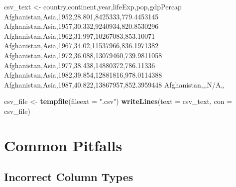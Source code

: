 \documentclass[
]{report}
\newenvironment{Shaded}{\begin{snugshade}}{\end{snugshade}}
\newcommand{\DataTypeTok}[1]{\textcolor[rgb]{0.13,0.29,0.53}{#1}}
\newcommand{\KeywordTok}[1]{\textcolor[rgb]{0.13,0.29,0.53}{\textbf{#1}}}
\newcommand{\NormalTok}[1]{#1}
\newcommand{\StringTok}[1]{\textcolor[rgb]{0.31,0.60,0.02}{#1}}
\begin{document}
\begin{Shaded}
\begin{Highlighting}[]
\NormalTok{csv\_text \textless{}{-}}\StringTok{ }
\StringTok{\textquotesingle{}country,continent,year,lifeExp,pop,gdpPercap}
\StringTok{Afghanistan,Asia,1952,28.801,8425333,779.4453145}
\StringTok{Afghanistan,Asia,1957,30.332,9240934,820.8530296}
\StringTok{Afghanistan,Asia,1962,31.997,10267083,853.10071}
\StringTok{Afghanistan,Asia,1967,34.02,11537966,836.1971382}
\StringTok{Afghanistan,Asia,1972,36.088,13079460,739.9811058}
\StringTok{Afghanistan,Asia,1977,38.438,14880372,786.11336}
\StringTok{Afghanistan,Asia,1982,39.854,12881816,978.0114388}
\StringTok{Afghanistan,Asia,1987,40.822,13867957,852.3959448}
\StringTok{Afghanistan,,,N/A,,\textquotesingle{}}

\NormalTok{csv\_file \textless{}{-}}\StringTok{ }\KeywordTok{tempfile}\NormalTok{(}\DataTypeTok{fileext =} \StringTok{".csv"}\NormalTok{)}
\KeywordTok{writeLines}\NormalTok{(}\DataTypeTok{text =}\NormalTok{ csv\_text, }\DataTypeTok{con =}\NormalTok{ csv\_file)}
\end{Highlighting}
\end{Shaded}

\hypertarget{common-pitfalls}{%
\section{Common Pitfalls}\label{common-pitfalls}}

\hypertarget{incorrect-column-types}{%
\subsection{Incorrect Column Types}\label{incorrect-column-types}}
\end{document}
